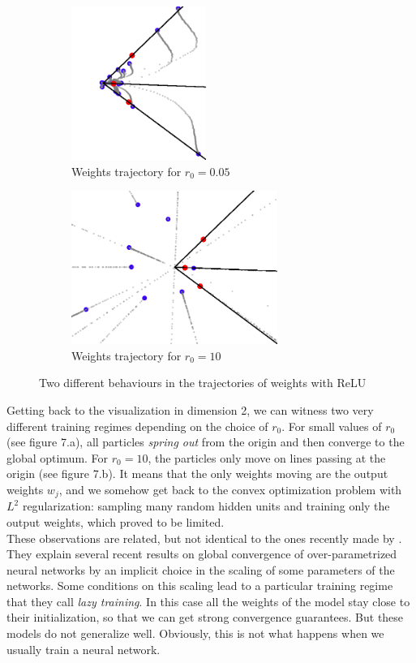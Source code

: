 \documentclass[a4paper, 11pt]{scrartcl}
\begin{document}
{\begin{figure}[h]
\centering
\begin{subfigure}{.5\textwidth}
  \centering
  \includegraphics[height=5cm]{005.png}
  \caption{Weights trajectory for $r_0=0.05$}
  \label{fig:sub3}
\end{subfigure}%
\begin{subfigure}{.5\textwidth}
  \centering
  \includegraphics[height=5cm]{10.png}
  \caption{Weights trajectory for $r_0=10$}
  \label{fig:sub4}
\end{subfigure}%
  \caption{Two different behaviours in the trajectories of weights with ReLU}
\end{figure}

Getting back to the visualization in dimension 2, we can witness two very different training regimes depending on the choice of $r_0$. For small values of $r_0$ (see figure 7.a), all particles \textit{spring out} from the origin and then converge to the global optimum. For $r_0=10$, the particles only move on lines passing at the origin (see figure 7.b). It means that the only weights moving are the output weights $w_j$, and we somehow get back to the convex optimization problem with $L^2$ regularization: sampling many random hidden units and training only the output weights, which proved to be limited.\\



These observations are related, but not identical to the ones recently made by  \cite{chizat:hal-01945578}. They explain several recent results on global convergence of over-parametrized neural networks by an implicit choice in the scaling of some parameters of the networks. Some conditions on this scaling lead to a particular training regime that they call \textit{lazy training}. In this case all the weights of the model stay close to their initialization, so that we can get strong convergence guarantees. But these models do not generalize well. Obviously, this is not what happens when we usually train a neural network.

}
\end{document}
